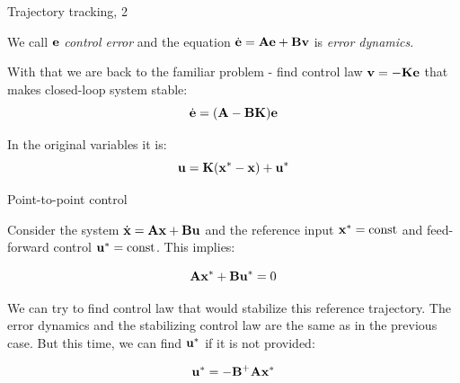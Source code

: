 \documentclass{beamer}
\begin{document}
\begin{frame}{Trajectory tracking, 2}
	\begin{flushleft}
		
		We call $\mathbf{e}$ \emph{control error} and the equation $\dot{\mathbf{e}} = \mathbf{A}\mathbf{e} + \mathbf{B}\mathbf{v}$ is \emph{error dynamics}.
		
		\bigskip
		
		With that we are back to the familiar problem - find control law $\mathbf{v} = -\mathbf{K}\mathbf{e}$ that makes closed-loop system stable:
		\begin{equation}
			\dot{\mathbf{e}} = (\mathbf{A} - \mathbf{B}\mathbf{K}) \mathbf{e}
		\end{equation}
		
		In the original variables it is:
		\begin{equation}
			\mathbf{u} = \mathbf{K}(\mathbf{x}^* - \mathbf{x}) + \mathbf{u}^*
		\end{equation}
		
	\end{flushleft}
\end{frame}




\begin{frame}{Point-to-point control}
	\begin{flushleft}
		
		Consider the system $\dot{\mathbf{x}} = \mathbf{A}\mathbf{x} + \mathbf{B}\mathbf{u}$ and the reference input $\mathbf{x}^* = \text{const}$ and feed-forward control $\mathbf{u}^*= \text{const}$. This implies:
		
		\begin{equation}
			\mathbf{A}\mathbf{x}^* + \mathbf{B}\mathbf{u}^* = 0
		\end{equation}		
		
		We can try to find control law that would stabilize this reference trajectory. The error dynamics and the stabilizing control law are the same as in the previous case. But this time, we can find $\mathbf{u}^*$ if it is not provided:
		
		\begin{equation}
			 \mathbf{u}^* = -\mathbf{B}^+\mathbf{A}\mathbf{x}^*
		\end{equation}				
		
	\end{flushleft}
\end{frame}
\end{document}
